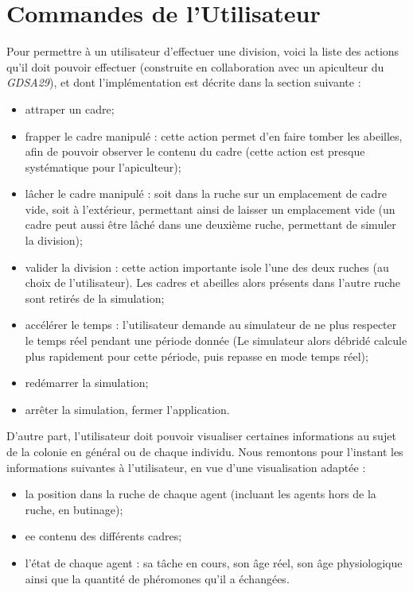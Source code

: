 		

	\section{Commandes de l'Utilisateur}
	
	Pour permettre à un utilisateur d'effectuer une division, voici la liste des actions qu'il doit pouvoir effectuer (construite en collaboration avec un apiculteur du \textit{GDSA29}), et dont l'implémentation est décrite dans la section suivante :
		\begin{itemize}
			\item attraper un cadre;
			\item frapper le cadre manipulé : cette action permet d'en faire tomber les abeilles, afin de pouvoir observer le contenu du cadre (cette action est presque systématique pour l'apiculteur);
			\item lâcher le cadre manipulé : soit dans la ruche sur un emplacement de cadre vide, soit à l'extérieur, permettant ainsi de laisser un emplacement vide (un cadre peut aussi être lâché dans une deuxième ruche, permettant de simuler la division);
			\item valider la division : cette action importante isole l'une des deux ruches (au choix de l'utilisateur). Les cadres et abeilles alors présents dans l'autre ruche sont retirés de la simulation;
			\item accélérer le temps : l'utilisateur demande au simulateur de ne plus respecter le temps réel pendant une période donnée (Le simulateur alors débridé calcule plus rapidement pour cette période, puis repasse en mode temps réel);
			\item redémarrer la simulation;
			\item arrêter la simulation, fermer l'application.
		\end{itemize}	
		
		D'autre part, l'utilisateur doit pouvoir visualiser certaines informations au sujet de la colonie en général ou de chaque individu. Nous remontons pour l'instant les informations suivantes à l'utilisateur, en vue d'une visualisation adaptée :
		\begin{itemize}
			\item la position dans la ruche de chaque agent (incluant les agents hors de la ruche, en butinage);
			\item ee contenu des différents cadres;
			\item l'état de chaque agent : sa tâche en cours, son âge réel, son âge physiologique ainsi que la quantité de phéromones qu'il a échangées.
		\end{itemize}		


